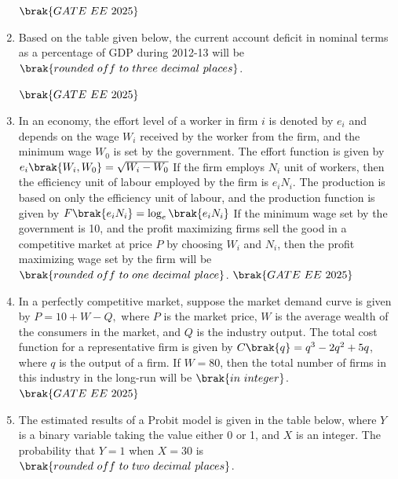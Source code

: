 \documentclass[journal,12pt,onecolumn]{IEEEtran}
\theoremstyle{remark}
\begin{document}
\begin{enumerate}
\begin{table}[H]
\centering

\end{table}
 \hfill $\brak{GATE\ EE\ 2025}$
\item Based on the table given below, the current account deficit in nominal terms as a percentage of GDP during 2012-13 will be \underline{\hspace{2cm}} $\brak{rounded\ off\ to\ three\ decimal\ places}$.\\
\begin{table}[H]
\centering

\end{table}
 \hfill $\brak{GATE\ EE\ 2025}$
\item In an economy, the effort level of a worker in firm $i$ is denoted by $e_i$ and depends on the wage $W_i$ received by the worker from the firm, and the minimum wage $W_0$ is set by the government. The effort function is given by 
$
e_i\brak{W_i, W_0} = \sqrt{W_i - W_0}
$
If the firm employs $N_i$ unit of workers, then the efficiency unit of labour employed by the firm is $e_i N_i$. The production is based on only the efficiency unit of labour, and the production function is given by
$
F\brak{e_i N_i} = \log_e \brak{e_i N_i}
$
If the minimum wage set by the government is 10, and the profit maximizing firms sell the good in a competitive market at price $P$ by choosing $W_i$ and $N_i$, then the profit maximizing wage set by the firm will be \underline{\hspace{2cm}} $\brak{rounded\ off\ to\ one\ decimal\ place}$. 
 \hfill $\brak{GATE\ EE\ 2025}$
\item In a perfectly competitive market, suppose the market demand curve is given by 
$
P = 10 + W - Q,
$
where $P$ is the market price, $W$ is the average wealth of the consumers in the market, and $Q$ is the industry output. The total cost function for a representative firm is given by $C\brak{q} = q^3 - 2q^2 + 5q$, where $q$ is the output of a firm. If $W = 80$, then the total number of firms in this industry in the long-run will be \underline{\hspace{2cm}} $\brak{in\ integer}$.
 \hfill $\brak{GATE\ EE\ 2025}$
\item The estimated results of a Probit model is given in the table below, where $Y$ is a binary variable taking the value either 0 or 1, and $X$ is an integer. The probability that $Y = 1$ when $X = 30$ is \underline{\hspace{2cm}} $\brak{rounded\ off \ to \ two\ decimal\ places}$.  
\begin{table}[H]

\end{table}
\end{enumerate}
\end{document}
